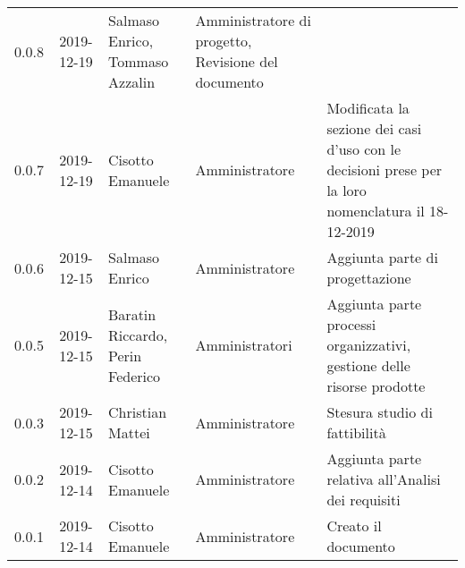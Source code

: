 {\begin{longtable}{c c  C{4cm}  C{3cm} C{4cm}}
0.0.8 & 2019-12-19 & Salmaso Enrico, Tommaso Azzalin & Amministratore di progetto, Revisione del documento \\

0.0.7 & 2019-12-19 & Cisotto Emanuele & Amministratore & Modificata la sezione dei casi d’uso con le decisioni prese per la loro nomenclatura il 18-12-2019 \\

0.0.6 & 2019-12-15 & Salmaso Enrico & Amministratore & Aggiunta parte di progettazione \\

0.0.5 & 2019-12-15 & Baratin Riccardo, Perin Federico  & Amministratori & Aggiunta parte processi organizzativi, gestione delle risorse prodotte \\

0.0.3 & 2019-12-15 & Christian Mattei & Amministratore & Stesura studio di fattibilità \\

0.0.2 & 2019-12-14 & Cisotto Emanuele & Amministratore & Aggiunta parte relativa all’Analisi dei requisiti \\

0.0.1 & 2019-12-14 & Cisotto Emanuele & Amministratore & Creato il documento \\
		
\end{longtable}
}